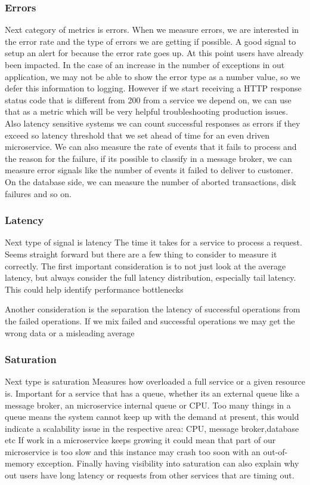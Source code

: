 \documentclass[a4paper, 11pt]{book}
\begin{document}
    \subsubsection{Errors}
    Next category of metrics is errors.
    When we measure errors, we are interested in the error rate and the type of errors we are getting if possible.
    A good signal to setup an alert for because the error rate goes up.
    At this point users have already been impacted.
    In the case of an increase in the number of exceptions in out application, we may not be able to show the error type as a number value, so we defer this information to logging.
    However if we start receiving a HTTP response status code that is different from 200 from a service we depend on, we can use that as a metric which will be very helpful troubleshooting production issues.
    Also latency sensitive systems we can count successful responses as errors if they exceed so latency threshold that we set ahead of time for an even driven microservice.
    We can also measure the rate of events that it fails to process and the reason for the failure, if its possible to classify in a message broker, we can measure error signals like the number of events it failed to deliver to customer.
    On the database side, we can measure the number of aborted transactions, disk failures and so on.

    \subsubsection{Latency}
    Next type of signal is latency
    The time it takes for a service to process a request.
    Seems straight forward but there are a few thing to consider to measure it correctly.
    The first important consideration is to not just look at the average latency, but always consider the full latency distribution, especially tail latency.
    This could help identify performance bottlenecks

    Another consideration is the separation the latency of successful operations from the failed operations.
    If we mix failed and successful operations we may get the wrong data or a misleading average

    \subsubsection{Saturation}
    Next type is saturation
    Measures how overloaded a full service or a given resource is.
    Important for a service that has a queue, whether its an external queue like a message broker, an microservice internal queue or CPU.
    Too many things in a queue means the system cannot keep up with the demand at present, this would indicate a scalability issue in the respective area: CPU, message broker,database etc
    If work in a microservice keeps growing it could mean that part of our microservice is too slow and this instance may crash too soon with an out-of-memory exception.
    Finally having visibility into saturation can also explain why out users have long latency or requests from other services that are timing out.
\end{document}
